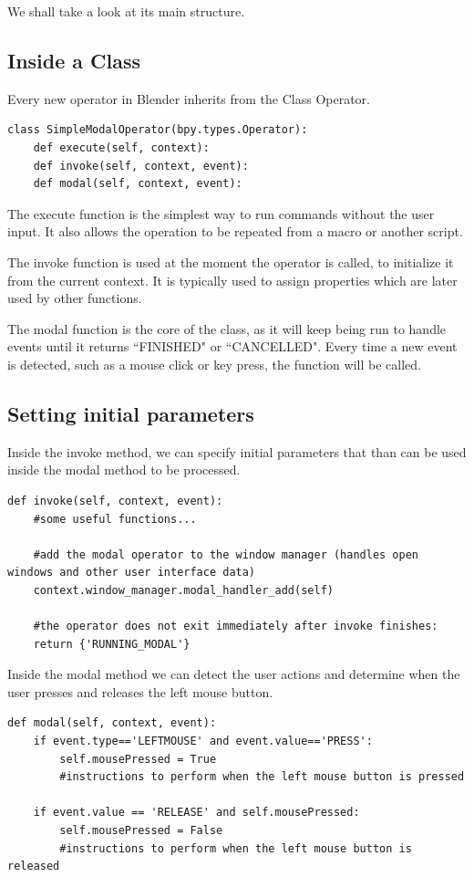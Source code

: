\documentclass[12pt,twoside]{report}
\begin{document}
We shall take a look at its main structure.

\subsection{Inside a Class}

Every new operator in Blender inherits from the Class Operator.

\begin{lstlisting}
class SimpleModalOperator(bpy.types.Operator):
    def execute(self, context):
    def invoke(self, context, event):
    def modal(self, context, event):
\end{lstlisting}

The execute function is the simplest way to run commands without the user input. It also allows the operation to be repeated from a macro or another script.

The invoke function is used at the moment the operator is called, to initialize it from the current context. It is typically used to assign properties which are later used by other functions.

The modal function is the core of the class, as it will keep being run to handle events until it returns ``FINISHED" or ``CANCELLED". Every time a new event is detected, such as a mouse click or key press, the function will be called.

\subsection{Setting initial parameters}

Inside the invoke method, we can specify initial parameters that than can be used inside the modal method to be processed.

\begin{lstlisting}
def invoke(self, context, event):
    #some useful functions...
    
    #add the modal operator to the window manager (handles open windows and other user interface data)
    context.window_manager.modal_handler_add(self)
    
    #the operator does not exit immediately after invoke finishes:
    return {'RUNNING_MODAL'}
\end{lstlisting}

Inside the modal method we can detect the user actions and determine when the user presses and releases the left mouse button.

\begin{lstlisting}
def modal(self, context, event):
    if event.type=='LEFTMOUSE' and event.value=='PRESS':
        self.mousePressed = True
        #instructions to perform when the left mouse button is pressed

    if event.value == 'RELEASE' and self.mousePressed:
        self.mousePressed = False
        #instructions to perform when the left mouse button is released
\end{lstlisting}
\end{document}
